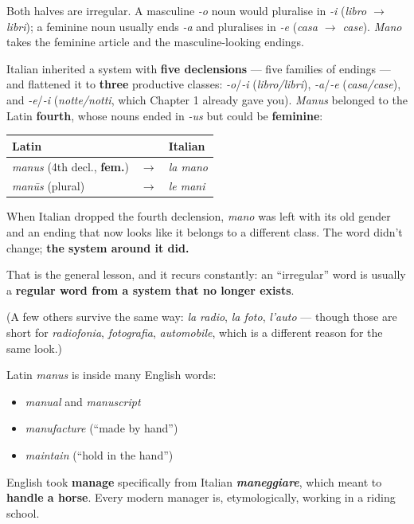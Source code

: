 Both halves are irregular. A masculine \emph{-o} noun would pluralise in \emph{-i} (\emph{libro $\to$ libri}); a feminine noun usually ends \emph{-a} and pluralises in \emph{-e} (\emph{casa $\to$ case}). \emph{Mano} takes the feminine article and the masculine-looking endings.

\begin{grammarlens}[title={Grammar Lens: five declensions}]
Italian inherited a system with \textbf{five declensions} — five families of endings — and flattened it to \textbf{three} productive classes: \emph{-o}/\emph{-i} (\emph{libro/libri}), \emph{-a}/\emph{-e} (\emph{casa/case}), and \emph{-e}/\emph{-i} (\emph{notte/notti}, which Chapter 1 already gave you). \emph{Manus} belonged to the Latin \textbf{fourth}, whose nouns ended in \emph{-us} but could be \textbf{feminine}:

\noindent
\begin{tabularx}{\linewidth}{@{}>{\raggedright\arraybackslash}X>{\raggedright\arraybackslash}X>{\raggedright\arraybackslash}X@{}}
\toprule
\textbf{Latin} & \textbf{} & \textbf{Italian} \\
\midrule
\emph{manus} (4th decl., \textbf{fem.}) & $\to$ & \emph{la mano} \\
\emph{manūs} (plural) & $\to$ & \emph{le mani} \\
\bottomrule
\end{tabularx}

When Italian dropped the fourth declension, \emph{mano} was left with its old gender and an ending that now looks like it belongs to a different class. The word didn't change; \textbf{the system around it did.}

That is the general lesson, and it recurs constantly: an \textquotedblleft{}irregular\textquotedblright{} word is usually a \textbf{regular word from a system that no longer exists}.

(A few others survive the same way: \emph{la radio}, \emph{la foto}, \emph{l'auto} — though those are short for \emph{radiofonia}, \emph{fotografia}, \emph{automobile}, which is a different reason for the same look.)
\end{grammarlens}

\begin{cousinweb}
Latin \emph{manus} is inside many English words:

\begin{itemize}
\raggedright
  \item \emph{manual} and \emph{manuscript}
  \item \emph{manufacture} (\textquotedblleft{}made by hand\textquotedblright{})
  \item \emph{maintain} (\textquotedblleft{}hold in the hand\textquotedblright{})
\end{itemize}

English took \textbf{manage} specifically from Italian \emph{\textbf{maneggiare}}, which meant to \textbf{handle a horse}. Every modern manager is, etymologically, working in a riding school.
\end{cousinweb}

